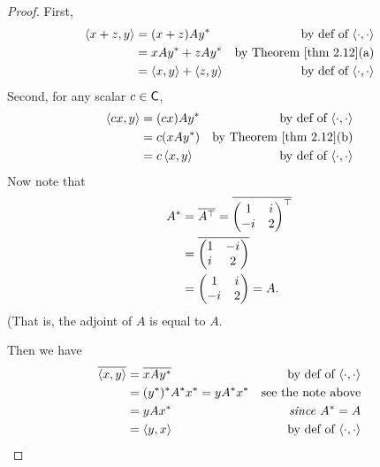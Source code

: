 \begin{proof}
First,
\begin{align*}
    \LG x + z, y \RG & = (x + z) A y^* & \text{by def of \(\InnerOp\)} \\
        & = x A y^* + z A y^* & \text{by \THM{2.12}(a)} \\
        & = \LG x, y \RG + \LG z, y \RG & \text{by def of \(\InnerOp\)}
\end{align*}
Second, for any scalar \(c \in \textsf{C}\),
\begin{align*}
    \LG cx, y \RG & = (cx) A y^* & \text{by def of \(\InnerOp\)} \\
        & = c(x A y^*) & \text{by \THM{2.12}(b)} \\
        & = c\LG x, y \RG & \text{by def of \(\InnerOp\)}
\end{align*}
Now note that
\begin{align*}
    A^* & = \overline{A^\top} = \overline{\begin{pmatrix} 1 & {i\mkern1mu} \\ -{i\mkern1mu} & 2 \end{pmatrix}^\top} \\
        & = \overline{\begin{pmatrix} 1 & -{i\mkern1mu} \\ {i\mkern1mu} & 2 \end{pmatrix}} \\
        & = \begin{pmatrix} 1 & {i\mkern1mu} \\ -{i\mkern1mu} & 2 \end{pmatrix} = A.
\end{align*}
(That is, the adjoint of \(A\) is equal to \(A\).

Then we have
\begin{align*}
    \overline{\left< x, y \right>} & = \overline{x A y^*} & \text{by def of \(\left<\cdot, \cdot \right>\)} \\
        & = (y^*)^* A^* x^* = y A^* x^* & \text{see the note above} \\
        & = y A x^* & \text{\emph{since} \(A^* = A\)} \\
        & = \left< y, x \right> & \text{by def of \(\left<\cdot, \cdot \right>\)}
\end{align*}


\end{proof}
